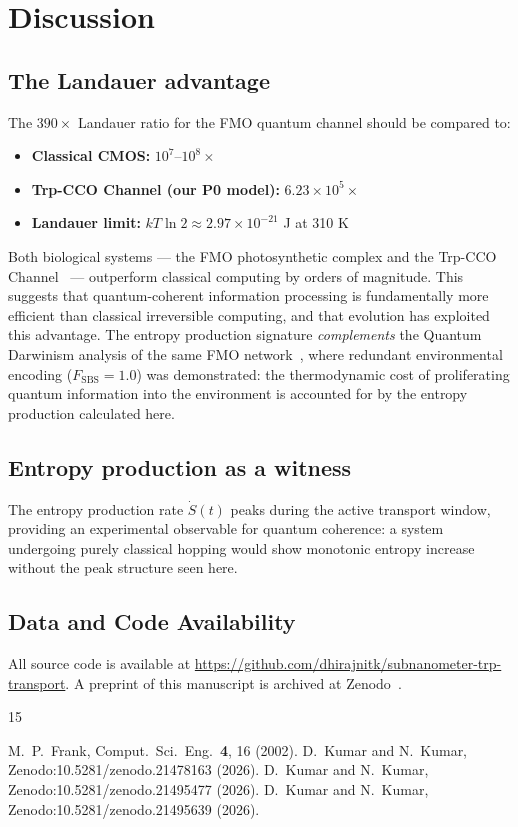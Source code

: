 \documentclass[aps,prl,twocolumn,showpacs,superscriptaddress]{revtex4-2}
\begin{document}
\section{Discussion}

\subsection{The Landauer advantage}

The $390\times$ Landauer ratio for the FMO quantum channel should be compared to:
\begin{itemize}
\item \textbf{Classical CMOS:} $10^7$--$10^8\times$ ~\cite{Frank2002}
\item \textbf{Trp-CCO Channel (our P0 model):} $6.23\times10^5\times$
\item \textbf{Landauer limit:} $kT\ln2 \approx 2.97\times10^{-21}$ J at 310 K
\end{itemize}

Both biological systems --- the FMO photosynthetic complex and the Trp-CCO Channel~\cite{TrpCCO2026} --- outperform classical computing by orders of magnitude. This suggests that quantum-coherent information processing is fundamentally more efficient than classical irreversible computing, and that evolution has exploited this advantage. The entropy production signature \emph{complements} the Quantum Darwinism analysis of the same FMO network~\cite{Darwin2026}, where redundant environmental encoding ($F_{\mathrm{SBS}} = 1.0$) was demonstrated: the thermodynamic cost of proliferating quantum information into the environment is accounted for by the entropy production calculated here.

\subsection{Entropy production as a witness}

The entropy production rate $\dot{S}(t)$ peaks during the active transport window, providing an experimental observable for quantum coherence: a system undergoing purely classical hopping would show monotonic entropy increase without the peak structure seen here.

\subsection{Data and Code Availability}

All source code is available at \url{https://github.com/dhirajnitk/subnanometer-trp-transport}. A preprint of this manuscript is archived at Zenodo~\cite{ThermoZenodo2026}.

\FloatBarrier
\begin{thebibliography}{15}

 M.\ P.\ Frank, Comput.\ Sci.\ Eng.\ \textbf{4}, 16 (2002).
 D.\ Kumar and N.\ Kumar, Zenodo:10.5281/zenodo.21478163 (2026).
 D.\ Kumar and N.\ Kumar, Zenodo:10.5281/zenodo.21495477 (2026).
 D.\ Kumar and N.\ Kumar, Zenodo:10.5281/zenodo.21495639 (2026).

\end{thebibliography}
\end{document}
